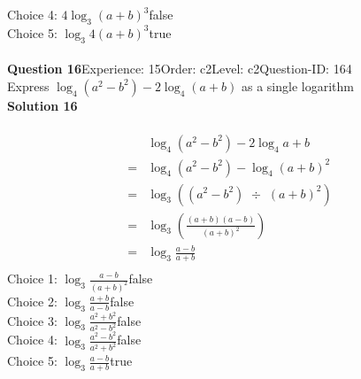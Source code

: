 \documentclass{article}
\begin{document}
Choice 4: \hspace{20pt}$4\log_{3}(a+b)^3$\hspace{20pt}false\\
Choice 5: \hspace{20pt}$\log_{3}4(a+b)^3$\hspace{20pt}true\\
\\[4pt]
\noindent\textbf{Question 16}\hspace{20pt}Experience: 15\hspace{20pt}Order: c2\hspace{20pt}Level: c2\hspace{20pt}Question-ID: 164\\[2pt]
Express $\log_{4}(a^2-b^2)-2\log_{4}(a+b)$ as a single logarithm\\[4pt]
\noindent\textbf{Solution 16}\\[2pt]
\\[-35pt]\begin{align*}
&\log_{4}(a^2-b^2)-2\log_{4}a+b\\[2pt]
=&\log_{4}(a^2-b^2)-\log_{4}(a+b)^2\\[2pt]
=&\log_{3}((a^2-b^2) \,\, \div \,\, (a+b)^2)\\[2pt]
=&\log_{3}\left(\displaystyle\frac{(a+b)(a-b)}{(a+b)^2}\right)\\[2pt]
=&\log_{3}\displaystyle\frac{a-b}{a+b}\\[-130pt]
\end{align*}
Choice 1: \hspace{20pt}$\log_{3}\displaystyle\frac{a-b}{(a+b)^2}$\hspace{20pt}false\\
Choice 2: \hspace{20pt}$\log_{3}\displaystyle\frac{a+b}{a-b}$\hspace{20pt}false\\
Choice 3: \hspace{20pt}$\log_{3}\displaystyle\frac{a^2+b^2}{a^2-b^2}$\hspace{20pt}false\\
Choice 4: \hspace{20pt}$\log_{3}\displaystyle\frac{a^2-b^2}{a^2+b^2}$\hspace{20pt}false\\
Choice 5: \hspace{20pt}$\log_{3}\displaystyle\frac{a-b}{a+b}$\hspace{20pt}true\\
\\[4pt]
\end{document}
